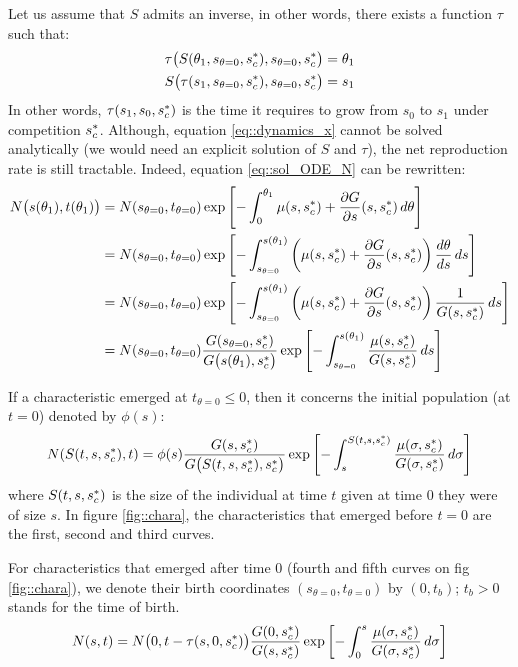 \begin{refsection}
Let us assume that $ S $ admits an inverse, in other words, there exists a function $ \tau $ such that:
\begin{align*}
	\tau \big( S(\theta_1, s_{\theta = 0}, {s}^{*}_c), s_{\theta = 0}, {s}^{*}_c \big) &= \theta_1 \\
	S \big(\tau(s_1, s_{\theta = 0}, {s}^{*}_c), s_{\theta = 0}, {s}^{*}_c \big) &= s_1
\end{align*}
In other words, $ \tau(s_1, s_0, {s}^{*}_c) $ is the time it requires to grow from $ s_0 $ to $ s_1 $ under competition $ {s}^{*}_c $. Although, equation \eqref{eq::dynamics_x} cannot be solved analytically (we would need an explicit solution of $ S $ and $ \tau $), the net reproduction rate is still tractable. Indeed, equation \eqref{eq::sol_ODE_N} can be rewritten:
\begin{align*}
	N \big( s(\theta_1), t(\theta_1) \big) &= N( s_{\theta = 0}, t_{\theta = 0}) \exp \left[-\int_0^{\theta_1} \mu(s, {s}^{*}_c) + \frac{\partial G}{\partial s}(s, {s}^{*}_c) \, d\theta \right] \\
	&= N( s_{\theta = 0}, t_{\theta = 0}) \exp \left[-\int_{s_{\theta = 0}}^{s(\theta_1)} \left( \mu(s, {s}^{*}_c) + \frac{\partial G}{\partial s}(s, {s}^{*}_c) \right) \frac{d \theta}{ds} \, ds \right] \\
	&= N( s_{\theta = 0}, t_{\theta = 0}) \exp \left[-\int_{s_{\theta = 0}}^{s(\theta_1)} \left( \mu(s, {s}^{*}_c) + \frac{\partial G}{\partial s}(s, {s}^{*}_c) \right) \frac{1}{G(s, {s}^{*}_c)} \, ds \right] \\
	&= N( s_{\theta = 0}, t_{\theta = 0}) \frac{G(s_{\theta = 0}, {s}^{*}_c)}{G \big( s(\theta_1), {s}^{*}_c \big)} \exp \left[-\int_{s_{\theta = 0}}^{s(\theta_1)} \frac{\mu(s, {s}^{*}_c)}{G(s, {s}^{*}_c)} \, ds \right] \\
\end{align*}

If a characteristic emerged at $ t_{\theta = 0} \leqslant 0 $, then it concerns the initial population (at $ t = 0 $) denoted by $ \phi(s) $:
\begin{equation}\label{eq::sol_init}
	N(S(t, s, {s}^{*}_c), t) = \phi(s) \frac{G(s, {s}^{*}_c)}{G\big( S(t, s, {s}^{*}_c), {s}^{*}_c \big)} \exp \left[ -\int_{s}^{S(t, s, {s}^{*}_c)} \frac{\mu(\sigma, {s}^{*}_c)}{G(\sigma, {s}^{*}_c)} \, d\sigma \right]
\end{equation}
where $ S(t, s, {s}^{*}_c) $ is the size of the individual at time $ t $ given at time $ 0 $ they were of size $ s $. In figure \ref{fig::chara}, the characteristics that emerged before $ t = 0 $ are the first, second and third curves.

For characteristics that emerged after time 0 (fourth and fifth curves on fig \ref{fig::chara}), we denote their birth coordinates $ (s_{\theta = 0}, t_{\theta = 0}) $ by $ (0, t_b) $; $ t_b > 0 $ stands for the time of birth.
\begin{equation}\label{eq::sol_later}
	N(s, t) = N \big( 0, t - \tau(s, 0, {s}^{*}_c) \big) \frac{G(0, {s}^{*}_c)}{G(s, {s}^{*}_c)} \exp \left[ -\int_{0}^{s} \frac{\mu(\sigma, {s}^{*}_c)}{G(\sigma, {s}^{*}_c)} \, d\sigma \right]
\end{equation}


\end{refsection}
